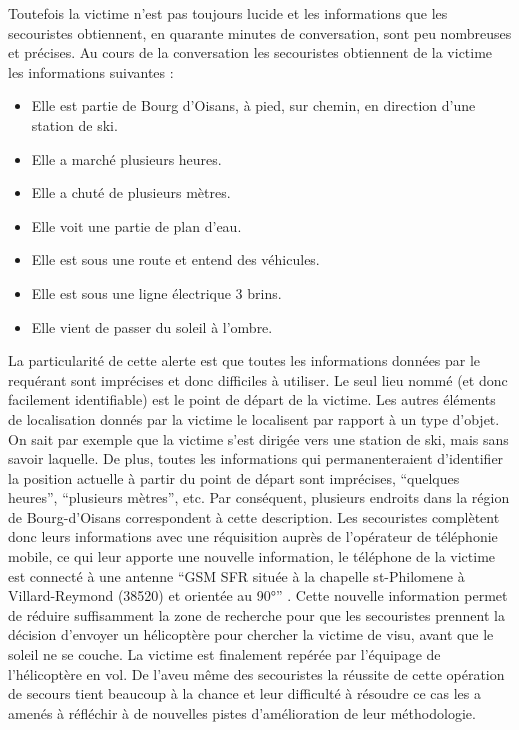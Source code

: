 Toutefois la victime n'est pas toujours lucide et les informations que
les secouristes obtiennent, en quarante minutes de conversation, sont
peu nombreuses et précises. Au cours de la conversation les
secouristes obtiennent de la victime les informations suivantes :

\begin{itemize}
\item Elle est partie de Bourg d'Oisans, à pied, sur chemin, en
  direction d'une station de ski.
\item Elle a marché plusieurs heures.
\item Elle a chuté de plusieurs mètres.
\item Elle voit une partie de plan d'eau.
\item Elle est sous une route et entend des véhicules.
\item Elle est sous une ligne électrique 3 brins.
\item Elle vient de passer du soleil à l'ombre.
\end{itemize}

La particularité de cette alerte est que toutes les informations
données par le requérant sont imprécises et donc difficiles à
utiliser. Le seul lieu nommé (et donc facilement identifiable) est le
point de départ de la victime. Les autres éléments de localisation
donnés par la victime le localisent par rapport à un type d'objet. On
sait par exemple que la victime s'est dirigée vers une station de ski,
mais sans savoir laquelle. De plus, toutes les informations qui
permanenteraient d'identifier la position actuelle à partir du point
de départ sont imprécises, \enquote{quelques heures},
\enquote{plusieurs mètres}, etc. Par conséquent, plusieurs endroits
dans la région de Bourg-d'Oisans correspondent à cette
description. Les secouristes complètent donc leurs informations avec
une réquisition auprès de l'opérateur de téléphonie mobile, ce qui
leur apporte une nouvelle information, le téléphone de la victime est
connecté à une antenne \enquote{GSM SFR située à la chapelle
  st-Philomene à Villard-Reymond (\num{38520}) et orientée au 90°}
\autocite{Lot 0.4}. Cette nouvelle information permet de réduire
suffisamment la zone de recherche pour que les secouristes prennent la
décision d'envoyer un hélicoptère pour chercher la victime de visu,
avant que le soleil ne se couche.
La victime est finalement repérée par l'équipage de l'hélicoptère en
vol. De l'aveu même des secouristes la réussite de cette opération de
secours tient beaucoup à la chance et leur difficulté à résoudre ce
cas les a amenés à réfléchir à de nouvelles pistes d'amélioration de
leur méthodologie.

